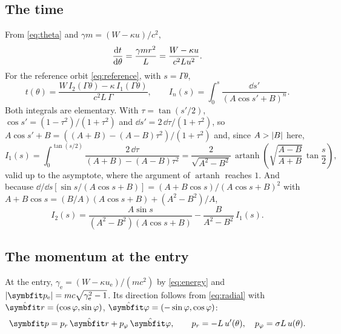 \documentclass{leveldoc}
\begin{document}
\subsection{The time}\label{sec:time}

From \eqref{eq:theta} and $\gamma m = (W - \kappa u)/c^2$,
\begin{equation}\label{eq:dtdth}
  \frac{\mathrm{d} t}{\mathrm{d} \theta} = \frac{\gamma m r^2}{L} = \frac{W - \kappa u}{c^2 L u^2}.
\end{equation}
For the reference orbit \eqref{eq:reference}, with $s = \Gamma\theta$,
\begin{equation}\label{eq:time}
  t(\theta) = \frac{W\,I_2(\Gamma\theta) - \kappa\,I_1(\Gamma\theta)}{c^2 L\,\Gamma},
  \qquad I_n(s) = \int_0^s \frac{\dd s'}{(A\cos s' + B)^n}.
\end{equation}
Both integrals are elementary. With $\tau = \tan(s'/2)$,
$\cos s' = (1-\tau^2)/(1+\tau^2)$ and $\dd s' = 2\,\dd\tau/(1+\tau^2)$, so
$A\cos s' + B = \left((A+B) - (A-B)\tau^2\right)/(1+\tau^2)$ and, since $A > \left\lvert B\right\rvert$ here,
\begin{equation}\label{eq:i1}
  I_1(s) = \int_0^{\tan(s/2)} \frac{2\,\dd\tau}{(A+B) - (A-B)\tau^2}
  = \frac{2}{\sqrt{A^2-B^2}}\,\operatorname{artanh}\!\left(\sqrt{\frac{A-B}{A+B}}\,\tan\frac{s}{2}\right),
\end{equation}
valid up to the asymptote, where the argument of $\operatorname{artanh}$ reaches $1$. And
because
$\dd/\dd s\left[\sin s/(A\cos s + B)\right] = (A + B\cos s)/(A\cos s + B)^2$ with
$A + B\cos s = (B/A)(A\cos s + B) + (A^2 - B^2)/A$,
\begin{equation}\label{eq:i2}
  I_2(s) = \frac{A\sin s}{(A^2-B^2)(A\cos s + B)} - \frac{B}{A^2-B^2}\,I_1(s).
\end{equation}

\subsection{The momentum at the entry}

At the entry, $\gamma_\mathrm{e} = (W - \kappa u_\mathrm{e})/(mc^2)$ by \eqref{eq:energy} and
$\abs{\vect{p}_\mathrm{e}} = mc\sqrt{\gamma_\mathrm{e}^2 - 1}$. Its direction follows from
\eqref{eq:radial} with $\uvec{r} = (\cos\varphi, \sin\varphi)$,
$\uvec{\varphi} = (-\sin\varphi, \cos\varphi)$:
\begin{equation}\label{eq:momentum}
  \vect{p} = p_r\,\uvec{r} + p_\varphi\,\uvec{\varphi}, \qquad p_r = -L\,u'(\theta), \quad
  p_\varphi = \sigma L\,u(\theta).
\end{equation}
\end{document}
